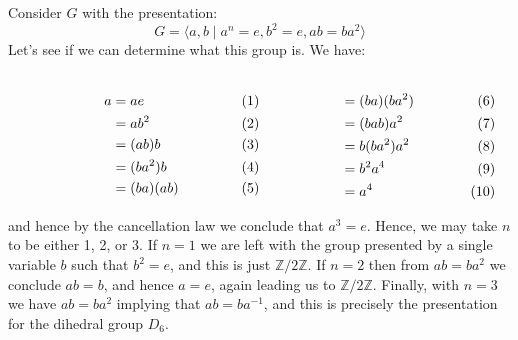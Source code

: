     \begin{example}
        Consider $G$ with the presentation:
        \begin{equation}
            G=\langle{a},b\;|\;a^{n}=e,b^{2}=e,ab=ba^{2}\rangle
        \end{equation}
        Let's see if we can determine what this group is. We have:
        \par\vspace{-2.5ex}
        \begin{subequations}
            \begin{minipage}[t]{0.49\textwidth}
                \begin{align}
                    a&=ae\\
                    &=ab^{2}\\
                    &=(ab)b\\
                    &=(ba^{2})b\\
                    &=(ba)(ab)
                \end{align}
            \end{minipage}
            \hfill
            \begin{minipage}[t]{0.49\textwidth}
                \begin{align}
                    &=(ba)(ba^{2})\\
                    &=(bab)a^{2}\\
                    &=b(ba^{2})a^{2}\\
                    &=b^{2}a^{4}\\
                    &=a^{4}
                \end{align}
            \end{minipage}
        \end{subequations}
        \par\vspace{2.5ex}
        and hence by the cancellation law we conclude that $a^{3}=e$.
        Hence, we may take $n$ to be either 1, 2, or 3. If $n=1$ we are
        left with the group presented by a single variable $b$ such that
        $b^{2}=e$, and this is just $\mathbb{Z}/2\mathbb{Z}$. If $n=2$
        then from $ab=ba^{2}$ we conclude $ab=b$, and hence $a=e$, again
        leading us to $\mathbb{Z}/2\mathbb{Z}$. Finally, with $n=3$ we
        have $ab=ba^{2}$ implying that $ab=ba^{\minus{1}}$, and this is
        precisely the presentation for the dihedral group $D_{6}$.
    \end{example}
